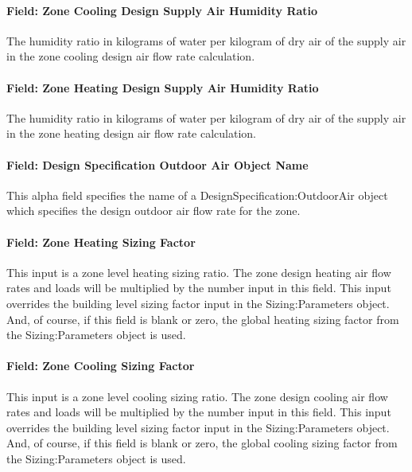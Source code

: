 \paragraph{Field: Zone Cooling Design Supply Air Humidity Ratio}\label{field-zone-cooling-design-supply-air-humidity-ratio}

The humidity ratio in kilograms of water per kilogram of dry air of the supply air in the zone cooling design air flow rate calculation.

\paragraph{Field: Zone Heating Design Supply Air Humidity Ratio}\label{field-zone-heating-design-supply-air-humidity-ratio}

The humidity ratio in kilograms of water per kilogram of dry air of the supply air in the zone heating design air flow rate calculation.

\paragraph{Field: Design Specification Outdoor Air Object Name}\label{field-design-specification-outdoor-air-object-name-000}

This alpha field specifies the name of a DesignSpecification:OutdoorAir object which specifies the design outdoor air flow rate for the zone.

\paragraph{Field: Zone Heating Sizing Factor}\label{field-zone-heating-sizing-factor}

This input is a zone level heating sizing ratio. The zone design heating air flow rates and loads will be multiplied by the number input in this field. This input overrides the building level sizing factor input in the Sizing:Parameters object. And, of course, if this field is blank or zero, the global heating sizing factor from the Sizing:Parameters object is used.

\paragraph{Field: Zone Cooling Sizing Factor}\label{field-zone-cooling-sizing-factor}

This input is a zone level cooling sizing ratio. The zone design cooling air flow rates and loads will be multiplied by the number input in this field. This input overrides the building level sizing factor input in the Sizing:Parameters object. And, of course, if this field is blank or zero, the global cooling sizing factor from the Sizing:Parameters object is used.

